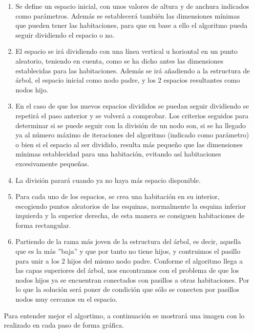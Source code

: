 \begin{enumerate}
    \item Se define un espacio inicial, con unos valores de altura y de anchura indicados como parámetros. Además se establecerá también las dimensiones mínimas que pueden tener las habitaciones, para que en base a ello el algoritmo pueda seguir dividiendo el espacio o no.
    
    \item El espacio se irá dividiendo con una línea vertical u horiontal en un punto aleatorio, teniendo en cuenta, como se ha dicho antes las dimensiones establecidas para las habitaciones. Además se irá añadiendo a la estructura de árbol, el espacio inicial como nodo padre, y los 2 espacios resultantes como nodos hijo.
    
    \item En el caso de que los nuevos espacios divididos se puedan seguir dividiendo se repetirá el paso anterior y se volverá a comprobar. Los criterios seguidos para determinar si se puede seguir con la división de un nodo son, si se ha llegado ya al número máximo de iteraciones del algoritmo (indicado como parámetro) o bien si el espacio al ser dividido, resulta más pequeño que las dimensiones mínimas establecidad para una habitación, evitando así habitaciones excesivamente pequeñas.
    
    \item La división parará cuando ya no haya más espacio disponible.
    
    \item Para cada uno de los espacios, se crea una habitación en su interior, escogiendo puntos aleatorios de las esquinas, normalmente la esquina inferior izquierda y la superior derecha, de esta manera se consiguen habitaciones de forma rectangular. 
    
    \item Partiendo de la rama más joven de la estructura del árbol, es decir, aquella que es la más ''baja'' y que por tanto no tiene hijos, y contruimos el pasillo para unir a los 2 hijos del mismo nodo padre. Conforme el algoritmo llega a las capas superiores del árbol, nos encontramos con el problema de que los nodos hijos ya se encuentran conectados con pasillos a otras habitaciones. Por lo que la solución será poner de condición que sólo se conecten por pasillos nodos muy cercanos en el espacio.  
    
\end{enumerate}

Para entender mejor el algortimo, a continuación se mostrará una imagen con lo realizado en cada paso de forma gráfica.

